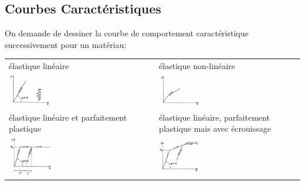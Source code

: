 \documentclass[a4paper]{article}
\begin{document}
\subsection{Courbes Caractéristiques}





On demande de dessiner la courbe de comportement caractéristique successivement pour un matériau:
\begin{center} \begin{tabular}{p{6cm}|p{6cm}}
élastique linéaire & élastique non-linéaire \\
\includegraphics[width=0.3\textwidth]{images/elastiquelineaire.PNG}
&
\includegraphics[width=0.3\textwidth]{images/elastiquenonlineaire.PNG}
\\ \hline
élastique linéaire et parfaitement plastique & élastique linéaire, parfaitement plastique mais avec écrouissage \\
\includegraphics[width=0.3\textwidth]{images/parfaitementplastique.PNG}
&
\includegraphics[width=0.3\textwidth]{images/ecrouissage.PNG}
\end{tabular} \end{center}
\end{document}

